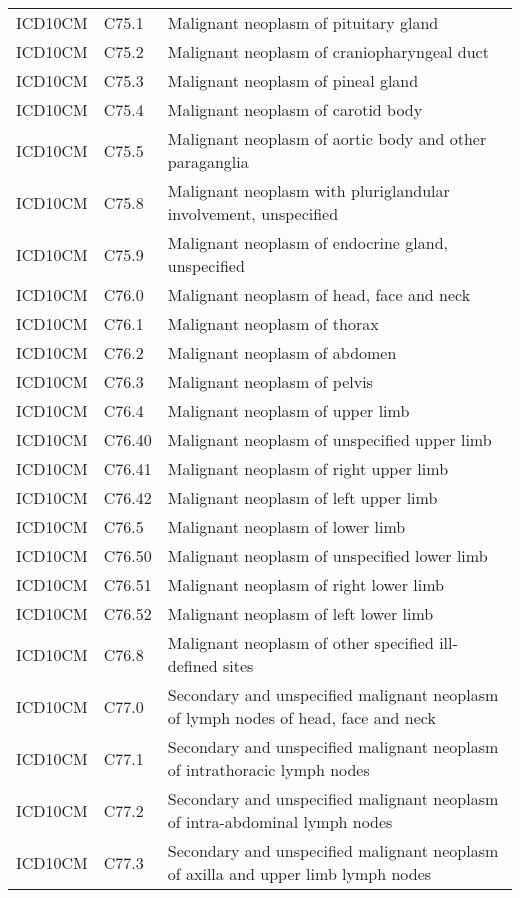 \begin{longtable}{p{}p{}p{}}
  ICD10CM & C75.1 & Malignant neoplasm of pituitary gland \\ 
  ICD10CM & C75.2 & Malignant neoplasm of craniopharyngeal duct \\ 
  ICD10CM & C75.3 & Malignant neoplasm of pineal gland \\ 
  ICD10CM & C75.4 & Malignant neoplasm of carotid body \\ 
  ICD10CM & C75.5 & Malignant neoplasm of aortic body and other paraganglia \\ 
  ICD10CM & C75.8 & Malignant neoplasm with pluriglandular involvement, unspecified \\ 
  ICD10CM & C75.9 & Malignant neoplasm of endocrine gland, unspecified \\ 
  ICD10CM & C76.0 & Malignant neoplasm of head, face and neck \\ 
  ICD10CM & C76.1 & Malignant neoplasm of thorax \\ 
  ICD10CM & C76.2 & Malignant neoplasm of abdomen \\ 
  ICD10CM & C76.3 & Malignant neoplasm of pelvis \\ 
  ICD10CM & C76.4 & Malignant neoplasm of upper limb \\ 
  ICD10CM & C76.40 & Malignant neoplasm of unspecified upper limb \\ 
  ICD10CM & C76.41 & Malignant neoplasm of right upper limb \\ 
  ICD10CM & C76.42 & Malignant neoplasm of left upper limb \\ 
  ICD10CM & C76.5 & Malignant neoplasm of lower limb \\ 
  ICD10CM & C76.50 & Malignant neoplasm of unspecified lower limb \\ 
  ICD10CM & C76.51 & Malignant neoplasm of right lower limb \\ 
  ICD10CM & C76.52 & Malignant neoplasm of left lower limb \\ 
  ICD10CM & C76.8 & Malignant neoplasm of other specified ill-defined sites \\ 
  ICD10CM & C77.0 & Secondary and unspecified malignant neoplasm of lymph nodes of head, face and neck \\ 
  ICD10CM & C77.1 & Secondary and unspecified malignant neoplasm of intrathoracic lymph nodes \\ 
  ICD10CM & C77.2 & Secondary and unspecified malignant neoplasm of intra-abdominal lymph nodes \\ 
  ICD10CM & C77.3 & Secondary and unspecified malignant neoplasm of axilla and upper limb lymph nodes \\ 

\end{longtable}
